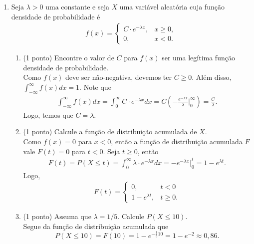 \documentclass{article}
\begin{document}
\begin{enumerate}

\item Seja $\lambda > 0$ uma constante e seja $X$ uma variável aleatória cuja função densidade de probabilidade é 
\begin{align*}
f(x) = \begin{cases}
C \cdot e^{-\lambda x}, & x \geq 0, \\
0, & x < 0.
\end{cases}
\end{align*}
\begin{enumerate}
	\item (1 ponto) Encontre o valor de $C$ para $f(x)$ ser uma legítima função densidade de probabilidade.\\
	{\color{blue}
	Como $f(x)$ deve ser não-negativa, devemos ter $C\geq 0$. Além disso, $\int_{-\infty}^{\infty} f(x)dx = 1$. Note que
	\begin{align*}
	\int_{-\infty}^{\infty} f(x)dx = \int_{0}^{\infty} C \cdot e^{-\lambda x}dx
	= C \left( -\frac{e^{-\lambda x}}{\lambda} \Big|_{0}^{\infty} \right) = \frac{C}{\lambda}.
	\end{align*}
	Logo, temos que $C = \lambda$.
	}

	\item (1 ponto) Calcule a função de distribuição acumulada de $X$.\\
	{\color{blue}
	Como $f(x)=0$ para $x<0$, então a função de distribuição acumulada $F$ vale $F(t)=0$ para $t < 0$. Seja $t \geq 0$, então
	\begin{align*}
	F(t) = P(X\leq t) = \int_{0}^{\infty} \lambda \cdot e^{-\lambda x}dx
	=  -e^{-\lambda x} \Big|_{0}^{t} = 1 - e^{\lambda t} .
	\end{align*}
	Logo,
	\begin{align*}
	F(t) = \begin{cases}
	0, & t<0 \ \\
	1 - e^{\lambda t}, & t\geq 0 .
	\end{cases}
	\end{align*}
	}
	
	\item (1 ponto) Assuma que $\lambda = 1/5$. Calcule $P(X \leq 10)$.\\
	{\color{blue}
	Segue da função de distribuição acumulada que
	$$
	P(X \leq 10) = F(10) = 1 - e^{-\frac{1}{5} 10} = 1 - e^{-2} \approx 0,86.
	$$
	}
\end{enumerate}


\end{enumerate}
\end{document}
